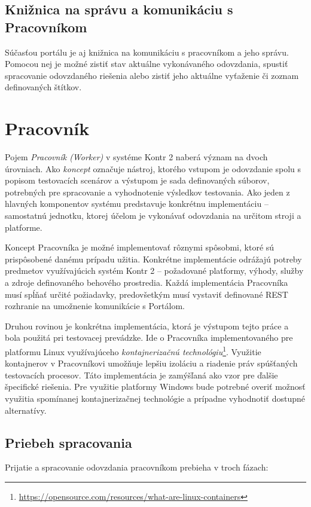 \documentclass[
  digital, %
  twoside, %
  table,   %
  lof,     %
  lot,     %
]{fithesis3}
\begin{document}
\subsection{Knižnica na správu a komunikáciu s Pracovníkom}
Súčasťou portálu je aj knižnica na komunikáciu s pracovníkom a jeho správu. Pomocou nej je možné zistiť stav aktuálne vykonávaného odovzdania, spustiť spracovanie odovzdaného riešenia alebo zistiť jeho aktuálne vyťaženie či zoznam definovaných štítkov.

\section{Pracovník}
Pojem \emph{Pracovník (Worker)} v systéme Kontr 2 naberá význam na dvoch úrovniach. Ako \emph{koncept} označuje nástroj, ktorého vstupom je odovzdanie spolu s popisom testovacích scenárov a výstupom je sada definovaných súborov, potrebných pre spracovanie a vyhodnotenie výsledkov testovania. Ako jeden z hlavných komponentov systému predstavuje konkrétnu implementáciu -- samostatnú jednotku, ktorej účelom je vykonávať odovzdania na určitom stroji a platforme. 

Koncept Pracovníka je možné implementovať rôznymi spôsobmi, ktoré sú prispôsobené danému prípadu užitia. Konkrétne implementácie odrážajú potreby predmetov využívajúcich systém Kontr 2 -- požadované platformy, výhody, služby a zdroje definovaného behového prostredia. Každá implementácia Pracovníka musí spĺňať určité požiadavky, predovšetkým musí vystaviť definované REST rozhranie na umožnenie komunikácie s Portálom. 

Druhou rovinou je konkrétna implementácia, ktorá je výstupom tejto práce a bola použitá pri testovacej prevádzke. Ide o Pracovníka implementovaného pre platformu Linux využívajúceho \emph{kontajnerizačnú technológiu}\footnote{\url{https://opensource.com/resources/what-are-linux-containers}}. Využitie kontajnerov v Pracovníkovi umožňuje lepšiu izoláciu a riadenie práv spúšťaných testovacích procesov. Táto implementácia je zamýšľaná ako vzor pre ďalšie špecifické riešenia. Pre využitie platformy Windows bude potrebné overiť možnosť využitia spomínanej kontajnerizačnej technológie a prípadne vyhodnotiť dostupné alternatívy.

\subsection{Priebeh spracovania}

Prijatie a spracovanie odovzdania pracovníkom prebieha v troch fázach:
\end{document}
